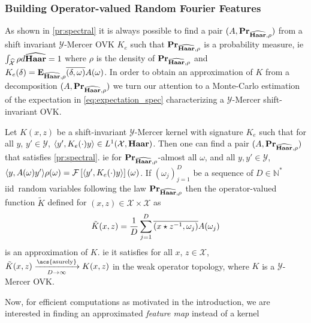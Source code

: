 \documentclass[twoside,11pt]{article}
\begin{document}
\subsubsection{Building Operator-valued Random Fourier Features}
As shown in \cref{pr:spectral} it is
always possible to find a pair $(A, {\mathbf{{Pr}}}_{\widehat{\mathbf{Haar}},\rho})$ from a
shift invariant $\mathcal{Y}$-Mercer \acl{OVK} $K_e$ such that
${\mathbf{{Pr}}}_{\widehat{\mathbf{Haar}},\rho}$ is a probability measure, \acs{ie}
$\int_{\widehat{\mathcal{X}}} \rho d\widehat{\mathbf{Haar}}=1$ where $\rho$ is the density of
${\mathbf{{Pr}}}_{\widehat{\mathbf{Haar}},\rho}$ and
$K_e(\delta)={\mathbf{{E}}}_{\widehat{\mathbf{Haar}},
\rho}{\overline{(\delta,\omega)}A(\omega)}$. In order to obtain an
approximation of $K$ from a decomposition $(A,
{\mathbf{{Pr}}}_{\widehat{\mathbf{Haar}},\rho})$ we turn our attention to a Monte-Carlo
estimation of the expectation in \cref{eq:expectation_spec} characterizing a
$\mathcal{Y}$-Mercer shift-invariant \acl{OVK}. %
\begin{proposition}
    \label{cr:ORFF-kernel} Let $K(x,z)$ be a shift-invariant
    $\mathcal{Y}$-Mercer kernel with signature $K_e$ such that for all $y$,
    $y'\in\mathcal{Y}$, $\langle y', K_e(\cdot)y\rangle\in L^1(\mathcal{X},\mathbf{Haar})$.
    Then one can find a pair $(A, {\mathbf{{Pr}}}_{\widehat{\mathbf{Haar}},\rho})$ that
    satisfies \cref{pr:spectral}. \acs{ie} for
    ${\mathbf{{Pr}}}_{\widehat{\mathbf{Haar}},\rho}$-almost all $\omega$, and all $y,
    y'\in\mathcal{Y}$, $\langle y, A(\omega)y'\rangle\rho(\omega)=\mathcal{F}\left[\langle y',
    K_e(\cdot)y\rangle\right](\omega)$.  If $(\omega_j)_{j=1}^D$ be a sequence of
    $D\in\mathbb{N}^*$ \acs{iid}~random variables following the law
    ${\mathbf{{Pr}}}_{\widehat{\mathbf{Haar}},\rho}$ then the operator-valued function
    $\tilde{K}$ defined for $(x,z) \in \mathcal{X}\times \mathcal{X}$ as
    \begin{dmath*}
        \tilde{K}(x,z)= \frac{1}{D} \sum_{j=1}^D
        \conj{\pairing{x\groupop\inv{z},\omega_j}} A(\omega_j)
    \end{dmath*}
    is an approximation of $K$. \acs{ie} it satisfies for all $x$,
    $z\in\mathcal{X}$, $\tilde{K}(x, z) \converges{\acs{asurely}}{D\to\infty}
    K(x, z)$ in the weak operator topology, where $K$ is a $\mathcal{Y}$-Mercer
    \acs{OVK}.
\end{proposition}
Now, for efficient computations as motivated in the introduction, we are
interested in finding an approximated \emph{feature map} instead of a kernel
\end{document}
